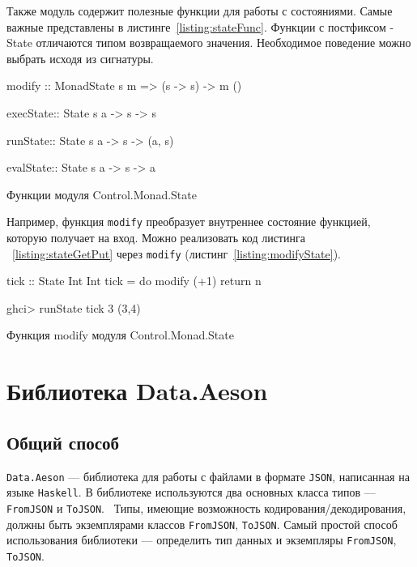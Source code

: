 Также модуль содержит полезные функции для работы с состояниями. Самые важные представлены в листинге~\ref{listing:stateFunc}. Функции с постфиксом -State отличаются типом возвращаемого значения. Необходимое поведение можно выбрать исходя из сигнатуры.

\begin{ListingEnv}[H]
\begin{Verb}
modify :: MonadState s m => (s -> s) -> m ()

execState:: State s a -> s -> s

runState:: State s a -> s -> (a, s)

evalState:: State s a -> s -> a
\end{Verb}
\caption{Функции модуля Control.Monad.State}
\label{listing:stateFunc}
\end{ListingEnv}

Например, функция \lstinline{modify} преобразует внутреннее состояние функцией, которую получает на вход. Можно реализовать код листинга ~\ref{listing:stateGetPut} через \lstinline{modify} (листинг~\ref{listing:modifyState}).

\begin{ListingEnv}[H]
\begin{Verb}
tick :: State Int Int
tick = do modify (+1)
          return n

ghci> runState tick 3
(3,4)
\end{Verb}
\caption{Функция modify модуля Control.Monad.State}
\label{listing:modifyState}
\end{ListingEnv}
	
\section{Библиотека Data.Aeson}
\label{sec:secAeson}

\subsection{Общий способ}

\lstinline{Data.Aeson} --- библиотека для работы с файлами в формате \lstinline{JSON}, написанная на языке \lstinline{Haskell}. В библиотеке используются два основных класса типов --- \lstinline{FromJSON} и \lstinline{ToJSON}.~\cite{aesonEx} Типы, имеющие возможность кодирования/декодирования, должны быть экземплярами классов \lstinline{FromJSON}, \lstinline{ToJSON}. Самый простой способ использования библиотеки --- определить тип данных и экземпляры \lstinline{FromJSON}, \lstinline{ToJSON}. 

